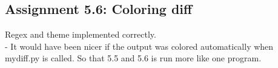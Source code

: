 \documentclass[a4paper]{article}
\begin{document}
\subsection*{Assignment 5.6:  Coloring diff}
Regex and theme implemented correctly.\\

- It would have been nicer if the output was colored automatically when mydiff.py is called. So that 5.5 and 5.6 is run more like one program.




\end{document}
